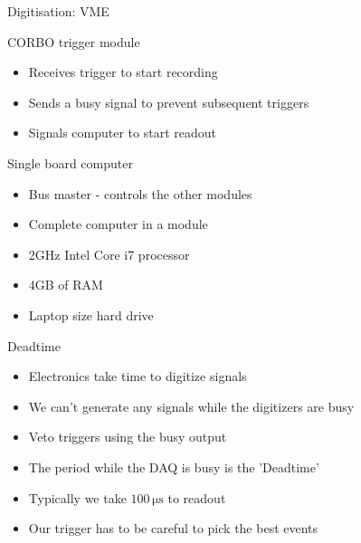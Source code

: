 \documentclass[9pt]{beamer}
\begin{document}
\begin{frame}{Digitisation: VME}
\begin{block}{CORBO trigger module}
  \begin{itemize}
    \item Receives trigger to start recording
    \item Sends a busy signal to prevent subsequent triggers
    \item Signals computer to start readout
  \end{itemize}
\end{block}
\begin{block}{Single board computer}
  \begin{itemize}
    \item Bus master - controls the other modules
    \item Complete computer in a module
    \item 2GHz Intel Core i7 processor
    \item 4GB of RAM
    \item Laptop size hard drive
  \end{itemize}
\end{block}
\end{frame}

\begin{frame}{Deadtime}
  \begin{itemize}
    \item Electronics take time to digitize signals
    \item We can't generate any signals while the digitizers are busy
    \item Veto triggers using the busy output
    \item The period while the DAQ is busy is the 'Deadtime'
    \item Typically we take $100\,\mathrm{\mu s}$ to readout
    \item Our trigger has to be careful to pick the best events
  \end{itemize}
\end{frame}
\end{document}
